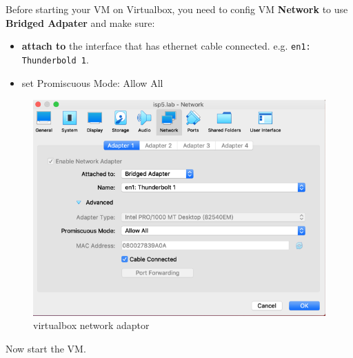 \documentclass[11pt]{article}
\begin{document}
Before starting your VM on Virtualbox, you need to config VM \textbf{Network} to use \textbf{Bridged Adpater} and make sure:

\begin{itemize}
\item \textbf{attach to} the interface that has ethernet cable connected. e.g. \texttt{en1: Thunderbold 1}.
\item set Promiscuous Mode: Allow All
\end{itemize}

\begin{figure}[htbp]
\centering
\includegraphics[width=.9\linewidth]{./img/vm.png}
\caption{virtualbox network adaptor}
\end{figure}

Now start the VM.
\end{document}

